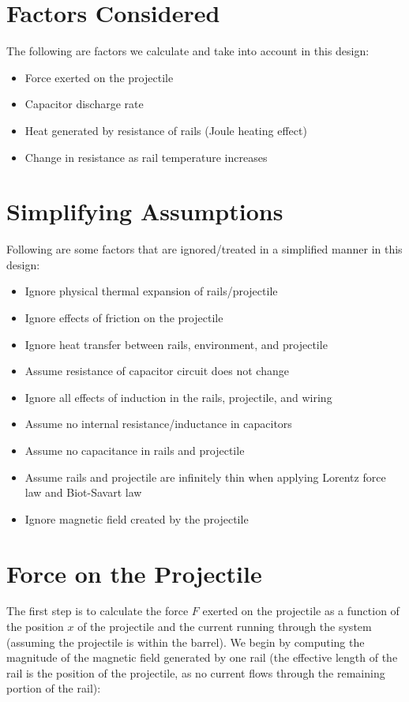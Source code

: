 \documentclass[12pt]{article}
\begin{document}
\section{Factors Considered}
The following are factors we calculate and take into account in this design: 
\begin{itemize}
    \item Force exerted on the projectile
    \item Capacitor discharge rate
    \item Heat generated by resistance of rails (Joule heating effect)
    \item Change in resistance as rail temperature increases
\end{itemize}

\section{Simplifying Assumptions}
Following are some factors that are ignored/treated in a simplified manner in this design:
\begin{itemize}
    \item Ignore physical thermal expansion of rails/projectile
    \item Ignore effects of friction on the projectile
    \item Ignore heat transfer between rails, environment, and projectile
    \item Assume resistance of capacitor circuit does not change
    \item Ignore all effects of induction in the rails, projectile, and wiring
    \item Assume no internal resistance/inductance in capacitors
    \item Assume no capacitance in rails and projectile
    \item Assume rails and projectile are infinitely thin when applying Lorentz force law and Biot-Savart law
    \item Ignore magnetic field created by the projectile 
\end{itemize}

\section{Force on the Projectile}

The first step is to calculate the force $F$ exerted on the projectile as a function of the position $x$ of the projectile and the current running through the system (assuming the projectile is within the barrel). We begin by computing the magnitude of the magnetic field generated by one rail (the effective length of the rail is the position of the projectile, as no current flows through the remaining portion of the rail): \\
\end{document}

